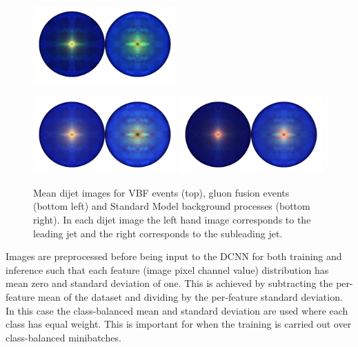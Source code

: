 \begin{figure}[h!]

    \centering
    \includegraphics[width=0.49\textwidth]{figures/event_selection/mean_vbf_LPS_uw.pdf}
    \begin{center}
        \includegraphics[width=0.49\textwidth]{figures/event_selection/mean_ggh_LPS_uw.pdf}
        \includegraphics[width=0.49\textwidth]{figures/event_selection/mean_bkg_LPS_uw.pdf}
    \end{center}
    \caption{Mean dijet images for VBF events (top), gluon fusion events (bottom left) and Standard Model background processes (bottom right). In each dijet image the left hand image corresponds to the leading jet and the right corresponds to the subleading jet.}
    \label{fig:event_categorisation:mean_jet_images}
\end{figure}

Images are preprocessed before being input to the DCNN for both training and inference such that each feature (image pixel channel value) distribution has mean zero and standard deviation of one. 
This is achieved by subtracting the per-feature mean of the dataset and dividing by the per-feature standard deviation.
In this case the class-balanced mean and standard deviation are used where each class has equal weight. This is important for when the training is carried out over class-balanced minibatches.



